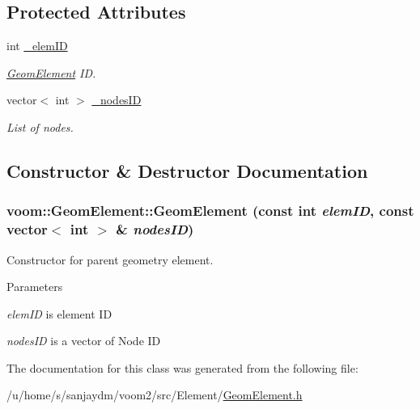 \subsection*{Protected Attributes}
\begin{DoxyCompactItemize}
\item 
\hypertarget{classvoom_1_1_geom_element_abe25de7b2864b04f7979c1bc179bd611}{
int \hyperlink{classvoom_1_1_geom_element_abe25de7b2864b04f7979c1bc179bd611}{\_\-elemID}}
\label{classvoom_1_1_geom_element_abe25de7b2864b04f7979c1bc179bd611}

\begin{DoxyCompactList}\small\item\em \hyperlink{classvoom_1_1_geom_element}{GeomElement} ID. \item\end{DoxyCompactList}\item 
\hypertarget{classvoom_1_1_geom_element_ac45cc5a468feaca2d0a651bfe3def0b5}{
vector$<$ int $>$ \hyperlink{classvoom_1_1_geom_element_ac45cc5a468feaca2d0a651bfe3def0b5}{\_\-nodesID}}
\label{classvoom_1_1_geom_element_ac45cc5a468feaca2d0a651bfe3def0b5}

\begin{DoxyCompactList}\small\item\em List of nodes. \item\end{DoxyCompactList}\end{DoxyCompactItemize}


\subsection{Constructor \& Destructor Documentation}
\hypertarget{classvoom_1_1_geom_element_a81373f05c7c57bf7f525766d6b6f679b}{
\subsubsection[{GeomElement}]{\setlength{\rightskip}{0pt plus 5cm}voom::GeomElement::GeomElement (const int {\em elemID}, \/  const vector$<$ int $>$ \& {\em nodesID})}}
\label{classvoom_1_1_geom_element_a81373f05c7c57bf7f525766d6b6f679b}
Constructor for parent geometry element. 
\begin{DoxyParams}{Parameters}
\item[{\em elemID}]is element ID \item[{\em nodesID}]is a vector of Node ID \end{DoxyParams}


The documentation for this class was generated from the following file:\begin{DoxyCompactItemize}
\item 
/u/home/s/sanjaydm/voom2/src/Element/\hyperlink{_geom_element_8h}{GeomElement.h}\end{DoxyCompactItemize}
